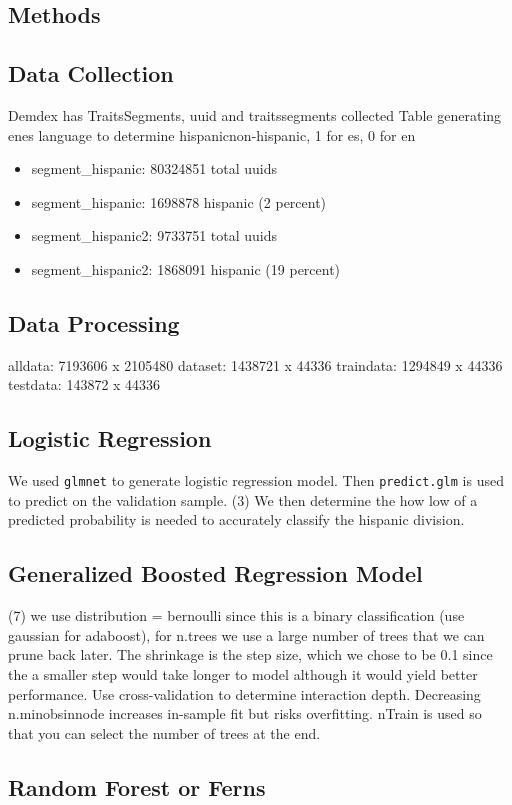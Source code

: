 \documentclass[a4paper]{article}
\begin{document}
\begin{multicols}{2}
\section*{Methods}
\subsection*{Data Collection}
Demdex has Traits\/Segments, uuid and traits\/segments collected
Table generating en\/es language to determine hispanic\/non-hispanic, 1 for es, 0 for en
\begin{itemize}
  \item segment\_hispanic: 80324851 total uuids
  \item segment\_hispanic: 1698878 hispanic (2 percent)
  \item segment\_hispanic2: 9733751 total uuids
  \item segment\_hispanic2: 1868091 hispanic (19 percent)
\end{itemize}
\subsection*{Data Processing}
alldata: 7193606 x 2105480
dataset: 1438721 x 44336
traindata: 1294849 x 44336
testdata: 143872 x 44336

\subsection*{Logistic Regression}
We used \texttt{glmnet} to generate logistic regression model.
Then \texttt{predict.glm} is used to predict on the validation sample.
(3) We then determine the how low of a predicted probability is needed to accurately classify the hispanic division.

\subsection*{Generalized Boosted Regression Model}
(7) we use distribution = bernoulli since this is a binary classification (use gaussian for adaboost), for n.trees we use a large number of trees that we can prune back later. The shrinkage is the step size, which we chose to be 0.1 since the a smaller step would take longer to model although it would yield better performance. Use cross-validation to determine interaction depth. Decreasing n.minobsinnode increases in-sample fit but risks overfitting. nTrain is used so that you can select the number of trees at the end.
\subsection*{Random Forest or Ferns}


\end{multicols}
\end{document}
